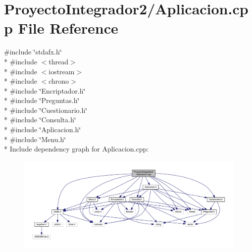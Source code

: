 \section{Proyecto\-Integrador2/\-Aplicacion.cpp File Reference}
\label{_aplicacion_8cpp}
{\ttfamily \#include \char`\"{}stdafx.\-h\char`\"{}}\\*
{\ttfamily \#include $<$thread$>$}\\*
{\ttfamily \#include $<$iostream$>$}\\*
{\ttfamily \#include $<$chrono$>$}\\*
{\ttfamily \#include \char`\"{}Encriptador.\-h\char`\"{}}\\*
{\ttfamily \#include \char`\"{}Preguntas.\-h\char`\"{}}\\*
{\ttfamily \#include \char`\"{}Cuestionario.\-h\char`\"{}}\\*
{\ttfamily \#include \char`\"{}Consulta.\-h\char`\"{}}\\*
{\ttfamily \#include \char`\"{}Aplicacion.\-h\char`\"{}}\\*
{\ttfamily \#include \char`\"{}Menu.\-h\char`\"{}}\\*
Include dependency graph for Aplicacion.\-cpp\-:\nopagebreak
\begin{figure}[H]
\begin{center}
\leavevmode
\includegraphics[width=350pt]{_aplicacion_8cpp__incl}
\end{center}
\end{figure}
